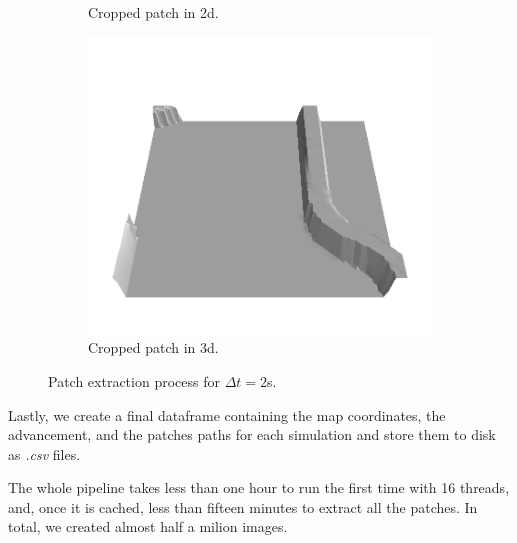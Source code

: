 \documentclass[../document.tex]{subfiles}
\begin{document}
\begin{figure}[htbp]
\begin{subfigure}[b]{0.45\textwidth}
        \caption{Cropped patch in 2d.}
    \end{subfigure}
    \begin{subfigure}[b]{0.45\textwidth}
        \includegraphics[width=\textwidth]{../img/3/crop/0.png}
        \caption{Cropped patch in 3d.}
    \end{subfigure}
\caption{Patch extraction process for $\Delta t = 2$s.}   
\end{figure}
Lastly, we create a final dataframe containing the map coordinates, the advancement, and the patches paths for each simulation and store them to disk as \emph{.csv} files. 

The whole pipeline takes less than one hour to run the first time with 16 threads, and, once it is cached, less than fifteen minutes to extract all the patches. In total, we created almost half a milion images.
\end{document}
